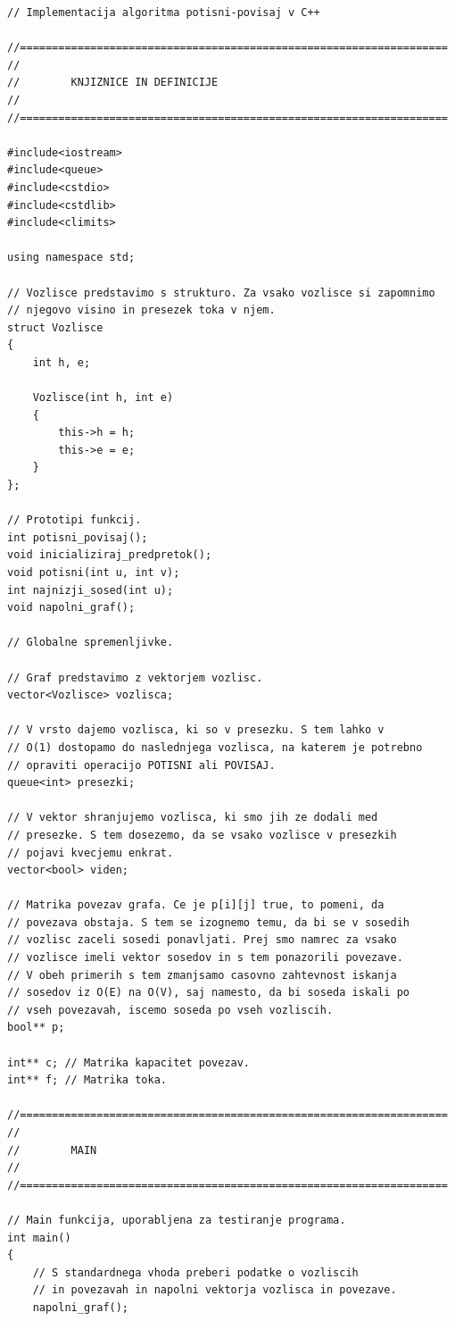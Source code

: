 \documentclass[mat1]{fmfdelo}
\begin{document}
\begin{verbatim}
// Implementacija algoritma potisni-povisaj v C++

//===================================================================
//
//        KNJIZNICE IN DEFINICIJE
//
//===================================================================

#include<iostream>
#include<queue>
#include<cstdio>
#include<cstdlib>
#include<climits>

using namespace std;

// Vozlisce predstavimo s strukturo. Za vsako vozlisce si zapomnimo
// njegovo visino in presezek toka v njem.
struct Vozlisce
{
    int h, e;

    Vozlisce(int h, int e)
    {
        this->h = h;
        this->e = e;
    }
};

// Prototipi funkcij.
int potisni_povisaj();
void inicializiraj_predpretok();
void potisni(int u, int v);
int najnizji_sosed(int u);
void napolni_graf();

// Globalne spremenljivke.

// Graf predstavimo z vektorjem vozlisc.
vector<Vozlisce> vozlisca;

// V vrsto dajemo vozlisca, ki so v presezku. S tem lahko v
// O(1) dostopamo do naslednjega vozlisca, na katerem je potrebno
// opraviti operacijo POTISNI ali POVISAJ.
queue<int> presezki;

// V vektor shranjujemo vozlisca, ki smo jih ze dodali med
// presezke. S tem dosezemo, da se vsako vozlisce v presezkih
// pojavi kvecjemu enkrat.
vector<bool> viden;

// Matrika povezav grafa. Ce je p[i][j] true, to pomeni, da
// povezava obstaja. S tem se izognemo temu, da bi se v sosedih
// vozlisc zaceli sosedi ponavljati. Prej smo namrec za vsako
// vozlisce imeli vektor sosedov in s tem ponazorili povezave.
// V obeh primerih s tem zmanjsamo casovno zahtevnost iskanja
// sosedov iz O(E) na O(V), saj namesto, da bi soseda iskali po
// vseh povezavah, iscemo soseda po vseh vozliscih.
bool** p;

int** c; // Matrika kapacitet povezav.
int** f; // Matrika toka.

//===================================================================
//
//        MAIN
//
//===================================================================

// Main funkcija, uporabljena za testiranje programa.
int main()
{
    // S standardnega vhoda preberi podatke o vozliscih
    // in povezavah in napolni vektorja vozlisca in povezave.
    napolni_graf();


\end{verbatim}
\end{document}
